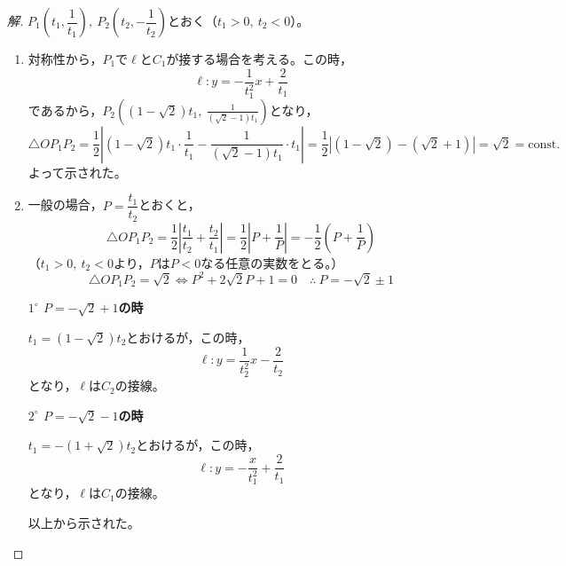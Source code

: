 \documentclass[../main.tex]{subfiles}
\begin{document}
\begin{proof}[解]
  $P_1\left(t_1,\dfrac1{t_1}\right),\ P_2\left(t_2,-\dfrac1{t_2}\right)$とおく（$t_1>0,\ t_2<0$）。

  \begin{center}
  \end{center}

  \begin{enumerate}
    \item[(1)] 対称性から，$P_1$で$\ell$と$C_1$が接する場合を考える。この時，
      \[
        \ell: y=-\frac{1}{t_1^2}x+\frac{2}{t_1}
      \]
      であるから，$P_2\left((1-\sqrt2)t_1,\ \frac{1}{(\sqrt2-1)t_1}\right)$となり，
      \[
        \triangle OP_1P_2=\frac12\left|(1-\sqrt2)t_1\cdot\frac{1}{t_1}-\frac{1}{(\sqrt2-1)t_1}\cdot t_1\right|=\frac12\left|(1-\sqrt2)-(\sqrt2+1)\right|=\sqrt2=\text{const.}
      \]
      よって示された。

    \item[(2)] 一般の場合，$P=\dfrac{t_1}{t_2}$とおくと，
      \[
        \triangle OP_1P_2=\frac12\left|\frac{t_1}{t_2}+\frac{t_2}{t_1}\right|=\frac12\left|P+\frac1P\right|=-\frac12\left(P+\frac1P\right)
      \]
      （$t_1>0,\ t_2<0$より，$P$は$P<0$なる任意の実数をとる。）
      \[
        \triangle OP_1P_2=\sqrt2 \iff P^2+2\sqrt2P+1=0 \quad\therefore\ P=-\sqrt2\pm1
      \]

      \textbf{$1^\circ$ $P=-\sqrt2+1$の時}

      $t_1=(1-\sqrt2)t_2$とおけるが，この時，
      \[
        \ell: y=\frac{1}{t_2^2}x-\frac{2}{t_2}
      \]
      となり，$\ell$は$C_2$の接線。

      \textbf{$2^\circ$ $P=-\sqrt2-1$の時}

      $t_1=-(1+\sqrt2)t_2$とおけるが，この時，
      \[
        \ell: y=-\frac{x}{t_1^2}+\frac{2}{t_1}
      \]
      となり，$\ell$は$C_1$の接線。

      以上から示された。
  \end{enumerate}
\end{proof}
\end{document}
